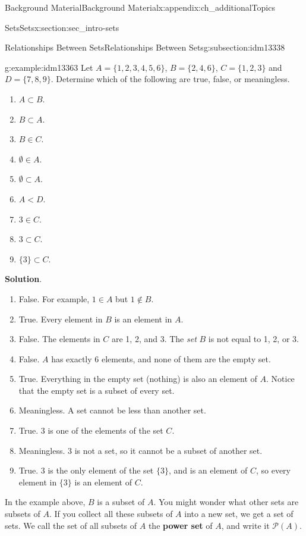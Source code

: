 \documentclass[oneside,10pt,]{book}
\newcommand{\terminology}[1]{\textbf{#1}}
\numberwithin{equation}{chapter}
\def\pow{\mathcal P}
\newcommand{\lt}{<}
\begin{document}
\begin{appendixptx}{Background Material}{}{Background Material}{}{}{x:appendix:ch_additionalTopics}
\begin{sectionptx}{Sets}{}{Sets}{}{}{x:section:sec_intro-sets}
\begin{subsectionptx}{Relationships Between Sets}{}{Relationships Between Sets}{}{}{g:subsection:idm13338}
\begin{example}{}{g:example:idm13363}%
Let \(A = \{1, 2, 3, 4, 5, 6\}\), \(B = \{2, 4, 6\}\), \(C = \{1, 2, 3\}\) and \(D = \{7, 8, 9\}\). Determine which of the following are true, false, or meaningless.%
\par
%
\begin{enumerate}
\item{}\(A \subset B\).%
\item{}\(B \subset A\).%
\item{}\(B \in C\).%
\item{}\(\emptyset \in A\).%
\item{}\(\emptyset \subset A\).%
\item{}\(A \lt  D\).%
\item{}\(3 \in C\).%
\item{}\(3 \subset C\).%
\item{}\(\{3\} \subset C\).%
\end{enumerate}
%
\par\smallskip%
\noindent\textbf{Solution}.\hypertarget{g:solution:idm13390}{}\quad{}%
\begin{enumerate}
\item{}False. For example, \(1\in A\) but \(1 \notin B\).%
\item{}True. Every element in \(B\) is an element in \(A\).%
\item{}False. The elements in \(C\) are 1, 2, and 3. The \emph{set} \(B\) is not equal to 1, 2, or 3.%
\item{}False. \(A\) has exactly 6 elements, and none of them are the empty set.%
\item{}True. Everything in the empty set (nothing) is also an element of \(A\). Notice that the empty set is a subset of every set.%
\item{}Meaningless. A set cannot be less than another set.%
\item{}True. \(3\) is one of the elements of the set \(C\).%
\item{}Meaningless. \(3\) is not a set, so it cannot be a subset of another set.%
\item{}True. \(3\) is the only element of the set \(\{3\}\), and is an element of \(C\), so every element in \(\{3\}\) is an element of \(C\).%
\end{enumerate}
%
\end{example}
In the example above, \(B\) is a subset of \(A\). You might wonder what other sets are subsets of \(A\). If you collect all these subsets of \(A\) into a new set, we get a set of sets. We call the set of all subsets of \(A\) the \terminology{power set}  of \(A\), and write it \(\pow(A)\).%

\end{subsectionptx}
\end{sectionptx}
\end{appendixptx}
\end{document}
